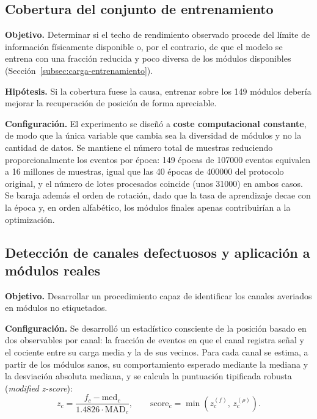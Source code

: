\subsection{Cobertura del conjunto de entrenamiento}
\label{subsec:exp-cobertura}

\textbf{Objetivo.} Determinar si el techo de rendimiento observado procede del límite de información
físicamente disponible o, por el contrario, de que el modelo se entrena con una fracción reducida y
poco diversa de los módulos disponibles (Sección~\ref{subsec:carga-entrenamiento}).

\textbf{Hipótesis.} Si la cobertura fuese la causa, entrenar sobre los 149 módulos debería mejorar
la recuperación de posición de forma apreciable.

\textbf{Configuración.} El experimento se diseñó a \textbf{coste computacional constante}, de modo
que la única variable que cambia sea la diversidad de módulos y no la cantidad de datos. Se
mantiene el número total de muestras reduciendo proporcionalmente los eventos por época: 149 épocas
de \num{107000} eventos equivalen a \num{16} millones de muestras, igual que las 40 épocas de
\num{400000} del protocolo original, y el número de lotes procesados coincide (unos \num{31000}) en
ambos casos. Se baraja además el orden de rotación, dado que la tasa de aprendizaje decae con la
época y, en orden alfabético, los módulos finales apenas contribuirían a la optimización.

\subsection{Detección de canales defectuosos y aplicación a módulos reales}
\label{subsec:exp-bad}

\textbf{Objetivo.} Desarrollar un procedimiento capaz de identificar los canales averiados en
módulos no etiquetados.

\textbf{Configuración.} Se desarrolló un estadístico consciente de la posición basado en dos
observables por canal: la fracción de eventos en que el canal registra señal y el cociente entre su
carga media y la de sus vecinos. Para cada canal se estima, a partir de los módulos sanos, su
comportamiento esperado mediante la mediana y la desviación absoluta mediana, y se calcula la
puntuación tipificada robusta (\emph{modified z-score}):
\begin{equation}
    z_c = \frac{f_c - \mathrm{med}_c}{1.4826 \cdot \mathrm{MAD}_c},
    \qquad
    \text{score}_c = \min\left(z_c^{(f)},\, z_c^{(\rho)}\right).
    \label{eq:zscore}
\end{equation}

